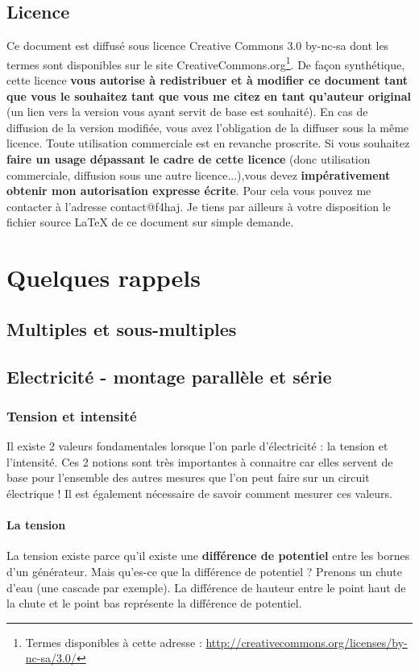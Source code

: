 \documentclass[a4paper,12pt,oneside]{report} %
\begin{document}
	\section{Licence}
	Ce document est diffusé sous licence Creative Commons 3.0 by-nc-sa dont les termes sont disponibles sur le site CreativeCommons.org\footnote{Termes disponibles à cette adresse : \url{http://creativecommons.org/licenses/by-nc-sa/3.0/}}. De façon synthétique, cette licence \textbf{vous autorise à redistribuer et à modifier ce document tant que vous le souhaitez tant que vous me citez en tant qu'auteur original} (un lien vers la version vous ayant servit de base est souhaité). En cas de diffusion de la version modifiée, vous avez l'obligation de la diffuser sous la même licence. Toute utilisation commerciale est en revanche proscrite. Si vous souhaitez \textbf{faire un usage dépassant le cadre de cette licence} (donc utilisation commerciale, diffusion sous une autre licence...),vous devez \textbf{impérativement obtenir mon autorisation expresse écrite}. Pour cela vous pouvez me contacter à l'adresse contact@f4haj. Je tiens par ailleurs à votre disposition le fichier source \LaTeX{} de ce document sur simple demande.

	\chapter{Quelques rappels}
		\section{Multiples et sous-multiples}
			

		\section{Electricité - montage parallèle et série}
			\subsection{Tension et intensité}
				Il existe 2 valeurs fondamentales lorsque l'on parle d'électricité : la tension et l'intensité. Ces 2 notions sont très importantes à connaitre car elles servent de base pour l'ensemble des autres mesures que l'on peut faire sur un circuit électrique ! Il est également nécessaire de savoir comment mesurer ces valeurs.
				\subsubsection{La tension}
				La tension existe parce qu'il existe une \textbf{différence de potentiel} entre les bornes d'un générateur. Mais qu'es-ce que la différence de potentiel ? Prenons un chute d'eau (une cascade par exemple). La différence de hauteur entre le point haut de la chute et le point bas représente la différence de potentiel.
\end{document}
